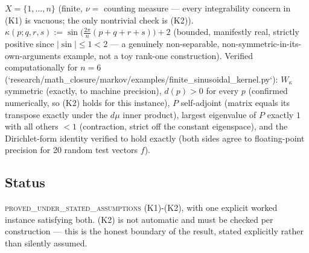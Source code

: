 $X=\{1,\dots,n\}$ (finite, $\nu=$ counting measure — every integrability
concern in (K1) is vacuous; the only nontrivial check is (K2)).
$\kappa(p;q,r,s) := \sin\!\big(\tfrac{2\pi}{n}(p+q+r+s)\big) + 2$ (bounded,
manifestly real, strictly positive since $|\sin|\le1<2$ — a genuinely
non-separable, non-symmetric-in-its-own-arguments example, not a toy
rank-one construction). Verified computationally for $n=6$
(`research/math_closure/markov/examples/finite_sinusoidal_kernel.py`):
$W_\kappa$ symmetric (exactly, to machine precision), $d(p)>0$ for every
$p$ (confirmed numerically, so (K2) holds for this instance), $P$
self-adjoint (matrix equals its transpose exactly under the $d\mu$ inner
product), largest eigenvalue of $P$ exactly $1$ with all others $<1$
(contraction, strict off the constant eigenspace), and the Dirichlet-form
identity verified to hold exactly (both sides agree to floating-point
precision for 20 random test vectors $f$).

\subsection*{Status}

\textsc{proved\_under\_stated\_assumptions} (K1)-(K2), with one explicit
worked instance satisfying both. (K2) is not automatic and must be
checked per construction — this is the honest boundary of the result,
stated explicitly rather than silently assumed.
